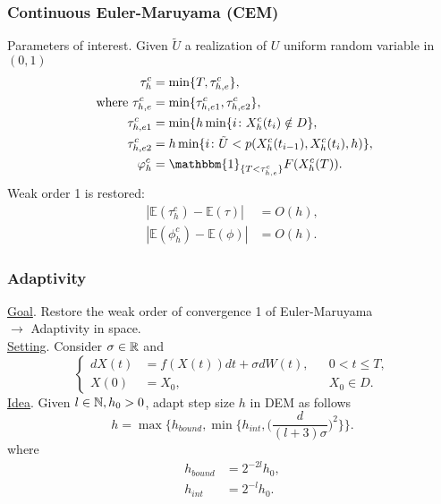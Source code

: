 \begin{frame}
\frametitle{Continuous Euler-Maruyama (CEM)}
Parameters of interest. Given $\tilde U$ a realization of $U$ uniform random variable in $(0,1)$
\begin{equation*}
\begin{aligned}
	\tau_h^c &= \min \{T,\tau_{h,e}^c\}, \\
	\text{ where } \tau_{h,e}^c &= \min\{\tau_{h,e1}^c, \tau_{h,e2}^c\}, \\
	\tau_{h,e1}^c &= \min\{h\min\{i \colon X_h^c(t_i) \notin D\}, \\
	\tau_{h,e2}^c &= h\min\{i \colon \tilde U < p(X_h^c(t_{i-1}),X_h^c(t_i),h) \}, \\
	\phi_h^c &= \mathbbm{1}_{\{T < \tau_{h,e}^c\}}F(X_h^c(T)).
\end{aligned}
\end{equation*}
Weak order 1 is restored:
\begin{align*}
	|\mathbb{E}(\tau_h^c) - \mathbb{E}(\tau)| &= O(h), \\
	|\mathbb{E}(\phi_h^c) - \mathbb{E}(\phi)| &= O(h).
\end{align*}
\end{frame}

\begin{frame} %
\frametitle{Adaptivity}
\underline{Goal}. Restore the weak order of convergence 1 of Euler-Maruyama \\
$\to$ Adaptivity in space. \\
\underline{Setting}. Consider $\sigma \in \mathbb{R}$ and
\begin{equation*}
\left \{
\begin{aligned}
	dX(t) &= f(X(t)) dt + \sigma dW(t), && 0 < t \leq T, \\
	X(0)  &= X_0, && X_0 \in D.
\end{aligned} \right .
\end{equation*}
\underline{Idea}. Given $l \in \mathbb{N}, h_0 > 0$, adapt step size $h$ in DEM as follows
\begin{equation*}
	h = \max\Big\{ h_{bound}, \min\Big\{ h_{int}, \Big(\frac{d}{(l + 3)\sigma}\Big)^2\Big\}\Big\}.
\end{equation*}
where
\begin{equation*}
\begin{aligned}
	h_{bound} &= 2^{-2l}h_0, \\
	h_{int} &= 2^{-l}h_0.
\end{aligned}
\end{equation*}
\end{frame}	

